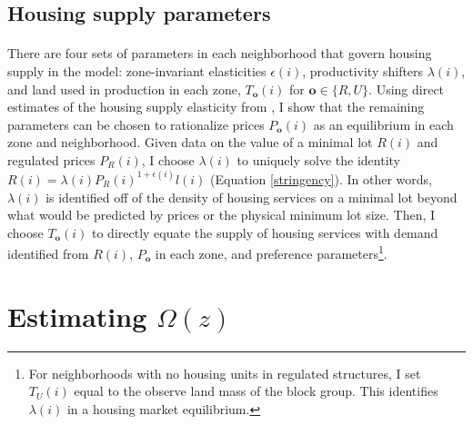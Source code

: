 \documentclass[12pt]{article}
\begin{document}
\subsection{Housing supply parameters}\label{Calibration:HousingSupply}
\paragraph*{}
There are four sets of parameters in each neighborhood that govern housing supply in the model:  zone-invariant elasticities $\epsilon(i)$, productivity shifters $\lambda(i)$, and land used in production in each zone, $T_{\boldsymbol{o}}(i)$ for $\boldsymbol{o} \in \{R, U\}$. Using direct estimates of the housing supply elasticity from \cite{BSH}, I show that the remaining parameters can be chosen to rationalize prices $P_{\boldsymbol{o}}(i)$ as an equilibrium in each zone and neighborhood. Given data on the value of a minimal lot $R(i)$ and regulated prices $P_{R}(i)$, I choose $\lambda(i)$ to uniquely solve the identity $R(i) = \lambda(i)P_{R}(i)^{1 + \epsilon(i)}l(i)$ (Equation \ref{stringency}). In other words, $\lambda(i)$ is identified off of the density of housing services on a minimal lot beyond what would be predicted by prices or the physical minimum lot size. Then, I choose $T_{\boldsymbol{o}}(i)$ to directly equate the supply of housing services with demand identified from $R(i)$, $P_{\boldsymbol{o}}$ in each zone, and preference parameters\footnote{For neighborhoods with no housing units in regulated structures, I set $T_{U}(i)$ equal to the observe land mass of the block group. This identifies $\lambda(i)$ in a housing market equilibrium.}. 






\section{Estimating $\Omega(z)$}\label{Section:EstNeighborhoodChoice}
\end{document}

